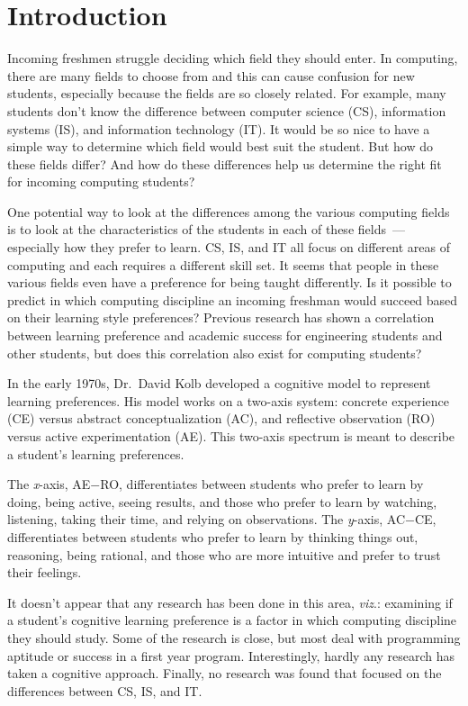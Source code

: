 \chapter{Introduction}\label{chp:chapter1}
Incoming freshmen struggle deciding which field they should enter. In computing, there are many fields to choose from and this can cause confusion for new students, especially because the fields are so closely related. For example, many students don't know the difference between computer science (CS), information systems (IS), and information technology (IT). It would be so nice to have a simple way to determine which field would best suit the student. But how do these fields differ? And how do these differences help us determine the right fit for incoming computing students?

One potential way to look at the differences among the various computing fields is to look at the characteristics of the students in each of these fields~--- especially how they prefer to learn. CS, IS, and IT all focus on different areas of computing and each requires a different skill set. It seems that people in these various fields even have a preference for being taught differently. Is it possible to predict in which computing discipline an incoming freshman would succeed based on their learning style preferences? Previous research has shown a correlation between learning preference and academic success for engineering students and other students, but does this correlation also exist for computing students?

In the early 1970s, Dr.\ David Kolb developed a cognitive model to represent learning preferences. His model works on a two-axis system: concrete experience (CE) versus abstract conceptualization (AC), and reflective observation (RO) versus active experimentation (AE). This two-axis spectrum is meant to describe a student's learning preferences.

The \textit{x}-axis, AE$-$RO, differentiates between students who prefer to learn by doing, being active, seeing results, and those who prefer to learn by watching, listening, taking their time, and relying on observations. The \textit{y}-axis, AC$-$CE, differentiates between students who prefer to learn by thinking things out, reasoning, being rational, and those who are more intuitive and prefer to trust their feelings.

It doesn't appear that any research has been done in this area, \textit{viz}.: examining if a student's cognitive learning preference is a factor in which computing discipline they should study. Some of the research is close, but most deal with programming aptitude or success in a first year program. Interestingly, hardly any research has taken a cognitive approach. Finally, no research was found that focused on the differences between CS, IS, and IT.

